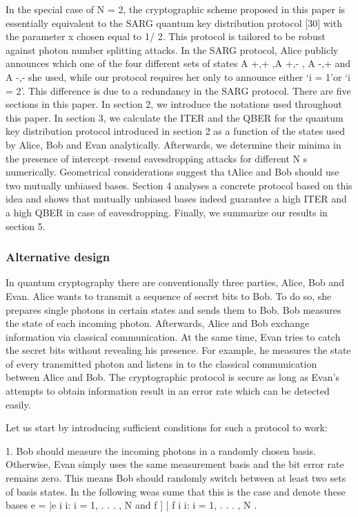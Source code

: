 In the special case of N = 2, the cryptographic scheme proposed in this paper is essentially equivalent to the SARG quantum key distribution protocol [30] with the parameter x chosen equal to 1/ 2. This protocol is tailored to be robust against photon number splitting attacks. In the SARG protocol, Alice publicly announces which one of the four different sets of states A +,+ ,A +,- , A -,+ and A -,- she used, while our protocol requires her only to announce either ‘i = 1’or ‘i = 2’. This difference is due to a redundancy in the SARG protocol.
There are five sections in this paper. In section 2, we introduce the notations used throughout this paper. In section 3, we calculate the ITER and the QBER for the quantum key distribution protocol introduced in section 2 as a function of the states used by Alice, Bob and Evan analytically. Afterwards, we determine their minima in the presence of intercept–resend eavesdropping attacks for different N s numerically. Geometrical considerations suggest tha tAlice and Bob should use two mutually unbiased bases. Section 4 analyses a concrete protocol based on this idea and shows that mutually unbiased bases indeed guarantee a high ITER and a high QBER in case of eavesdropping. Finally, we summarize our results in section 5.

\subsubsection{Alternative design}

In quantum cryptography there are conventionally three parties, Alice, Bob and Evan. Alice wants to transmit a sequence of secret bits to Bob. To do so, she prepares single photons in certain states and sends them to Bob. Bob measures the state of each incoming photon. Afterwards, Alice and Bob exchange information via classical communication. At the same time, Evan tries to catch the secret bits without revealing his presence. For example, he measures the state of every transmitted photon and listens in to the classical communication between Alice and Bob. The cryptographic protocol is secure as long as Evan’s attempts to obtain information result in an error rate which can be detected easily.

Let us start by introducing sufficient conditions for such a protocol to work:

1. Bob should measure the incoming photons in a randomly chosen basis. Otherwise, Evan simply uses the same measurement basis and the bit error rate remains zero. This means Bob should randomly switch between at least two sets of basis states. In the following weas sume that this is the case and denote these bases e = {|e i i: i = 1, . . . , N }and f ] {| f i i: i = 1, . . . , N }.

